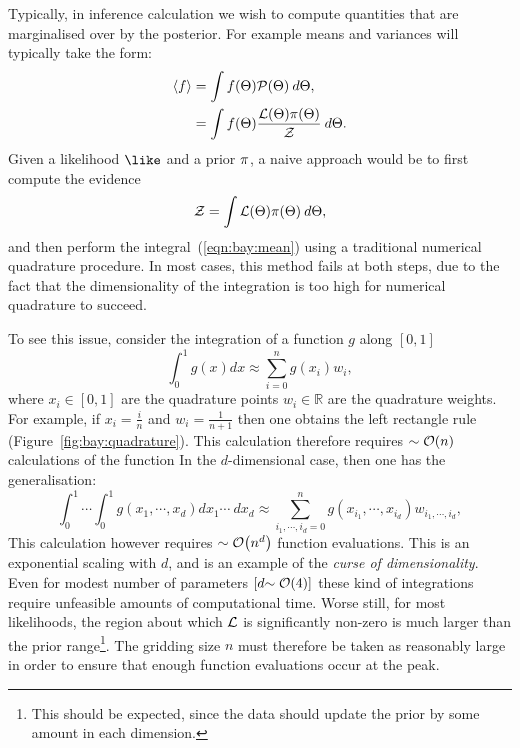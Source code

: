 Typically, in inference calculation we wish to compute quantities that are marginalised over by the posterior. For example means and variances will typically take the form:
\begin{align}
  {\left\langle{f}\right\rangle} 
  &= \int f(\Theta)\mathcal{P}(\Theta)\:d\Theta,
  \label{eqn:bay:mean}\\
  &= \int f(\Theta)\frac{\mathcal{L}(\Theta)\pi(\Theta)}{\mathcal{Z}}\:d\Theta.
\end{align}
Given a likelihood $\like$ and a prior $\pi$, a naive approach would be to first compute the evidence
\begin{equation}
  \mathcal{Z} = \int \mathcal{L}(\Theta) \pi(\Theta) \: d\Theta,
  \label{eqn:bay:ev_short}
\end{equation}
and then perform the integral~(\ref{eqn:bay:mean}) using a traditional numerical quadrature procedure. In most cases, this method fails at both steps, due to the fact that the dimensionality of the integration is too high for numerical quadrature to succeed.

To see this issue, consider the integration of a function $g$ along $[0,1]$
\begin{equation}
  \int_0^1 g(x) dx \approx \sum\limits_{i=0}^{n} g(x_i) w_i,
\end{equation}
where ${x_i\in[0,1]}$ are the quadrature points ${w_i\in\mathbb{R}}$ are the quadrature weights. For example, if $x_i = \frac{i}{n}$ and $w_i=\frac{1}{n+1}$ then one obtains the left rectangle rule (Figure~\ref{fig:bay:quadrature}). This calculation therefore requires ${\sim\mathcal{O}{\left(n\right)}}$ calculations of the function In the $d$-dimensional case, then one has the generalisation:
\begin{equation}
  \int_0^1\cdots\int_0^1 g(x_1,\cdots,x_d) dx_1\cdots \: dx_d \approx \sum\limits_{i_1,\cdots,i_d=0}^{n} g(x_{i_1},\cdots,x_{i_d}) w_{i_1,\cdots,i_d},
\end{equation}
This calculation however requires ${\sim\mathcal{O}{\left(n^d\right)}}$ function evaluations. This is an exponential scaling with $d$, and is an example of the {\em curse of dimensionality}. Even for modest number of parameters $\left[ d{\sim\mathcal{O}{\left(4\right)}} \right]$ these kind of integrations require unfeasible amounts of computational time. Worse still, for most likelihoods, the region about which $\mathcal{L}$ is significantly non-zero is much larger than the prior range\footnote{This should be expected, since the data should update the prior by some amount in each dimension.}. The gridding size $n$ must therefore be taken as reasonably large in order to ensure that enough function evaluations occur at the peak.

